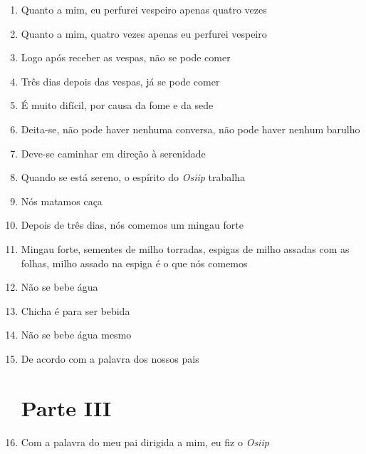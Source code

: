 \begin{enumerate}
 \item Quanto a mim, eu perfurei vespeiro apenas quatro vezes

 \item Quanto a mim, quatro vezes apenas eu perfurei vespeiro

 \begin{center}\end{center}

 \item Logo após receber as vespas, não se pode comer

 \item Três dias depois das vespas, já se pode comer

 \item É muito difícil, por causa da fome e da sede

 \item Deita-se, não pode haver nenhuma conversa, não pode haver nenhum
 barulho

 \item Deve-se caminhar em direção à serenidade

 \item Quando se está sereno, o espírito do \textit{Osiip} trabalha

 \item Nós matamos caça

 \begin{center}\end{center}

 \item Depois de três dias, nós comemos um mingau forte

 \item Mingau forte, sementes de milho torradas, espigas de milho assadas
 com as folhas, milho assado na espiga é o que nós comemos

 \item Não se bebe água

 \item Chicha é para ser bebida

 \item Não se bebe água mesmo

 \item De acordo com a palavra dos nossos pais

 \section{Parte III}

 \item Com a palavra do meu pai dirigida a mim, eu fiz o \textit{Osiip}


\end{enumerate}
